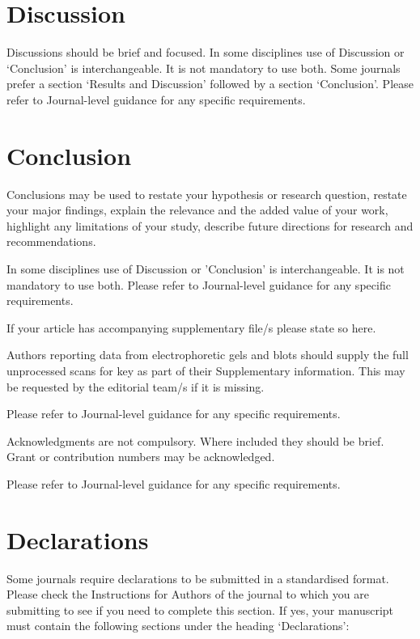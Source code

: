 \documentclass[default,pdflatex,iicol]{sn-jnl}%
\begin{document}
\section{Discussion}\label{sec12}

Discussions should be brief and focused. In some disciplines use of Discussion or `Conclusion' is interchangeable. It is not mandatory to use both. Some journals prefer a section `Results and Discussion' followed by a section `Conclusion'. Please refer to Journal-level guidance for any specific requirements. 

\section{Conclusion}\label{sec13}

Conclusions may be used to restate your hypothesis or research question, restate your major findings, explain the relevance and the added value of your work, highlight any limitations of your study, describe future directions for research and recommendations. 

In some disciplines use of Discussion or 'Conclusion' is interchangeable. It is not mandatory to use both. Please refer to Journal-level guidance for any specific requirements. 

\backmatter


If your article has accompanying supplementary file/s please state so here. 

Authors reporting data from electrophoretic gels and blots should supply the full unprocessed scans for key as part of their Supplementary information. This may be requested by the editorial team/s if it is missing.

Please refer to Journal-level guidance for any specific requirements.


Acknowledgments are not compulsory. Where included they should be brief. Grant or contribution numbers may be acknowledged.

Please refer to Journal-level guidance for any specific requirements.

\section*{Declarations}

Some journals require declarations to be submitted in a standardised format. Please check the Instructions for Authors of the journal to which you are submitting to see if you need to complete this section. If yes, your manuscript must contain the following sections under the heading `Declarations':
\end{document}
